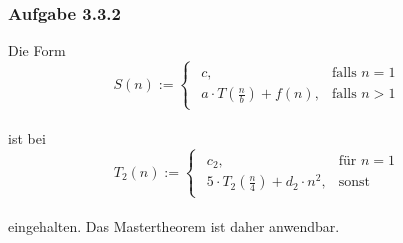 \documentclass{article}
\begin{document}
\subsubsection{Aufgabe 3.3.2}
    Die Form\\
    \[
	S(n) :=  \begin{cases}
	    	\begin{array}{ll}
    			c, & \text{falls }n=1\\
				a \cdot T(\frac{n}{b})+f(n), &\text{falls }n>1
			\end{array}
		\end{cases}
   	\]
   	\\
   	ist bei\\
   	\[
	T_2(n) := \begin{cases}
				\begin{array}{ll}
					c_2,			& \text{für }n=1\\
					5 \cdot T_2(\frac{n}{4})+d_2\cdot n^2, & \text{sonst}
				\end{array}
			\end{cases}
   	\]
   	\\
   	eingehalten. Das Mastertheorem ist daher anwendbar.\\
   	\\
\end{document}
